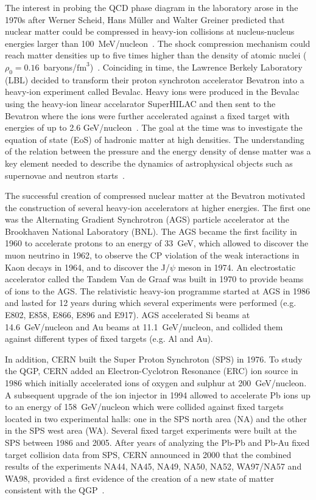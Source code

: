 The interest in probing the QCD phase diagram in the laboratory arose in the 1970s after Werner Scheid, Hans M{\"u}ller and Walter Greiner predicted that nuclear matter could be compressed in heavy-ion collisions at nucleus-nucleus energies larger than 100~MeV/nucleon~\cite{MatterShock}. The shock compression mechanism could reach matter densities up to five times higher than the density of atomic nuclei ($\rho_{0}=0.16$~baryons/$\mathrm{fm}^{3}$)~\cite{MatterShock}. Coinciding in time, the Lawrence Berkely Laboratory (LBL) decided to transform their proton synchroton accelerator Bevatron into a heavy-ion experiment called Bevalac. Heavy ions were produced in the Bevalac using the heavy-ion linear accelarator SuperHILAC and then sent to the Bevatron where the ions were further accelerated against a fixed target with energies of up to 2.6 GeV/nucleon~\cite{Bevalac}. The goal at the time was to investigate the equation of state (EoS) of hadronic matter at high densities. The understanding of the relation between the pressure and the energy density of dense matter was a key element needed to describe the dynamics of astrophysical objects such as supernovae and neutron starts~\cite{NeutronStar, DenseMatter}.

The successful creation of compressed nuclear matter at the Bevatron motivated the construction of several heavy-ion accelerators at higher energies. The first one was the Alternating Gradient Synchrotron (AGS) particle accelerator at the Brookhaven National Laboratory (BNL). The AGS became the first facility in 1960 to accelerate protons to an energy of 33~GeV, which allowed to discover the muon neutrino in 1962, to observe the CP violation of the weak interactions in Kaon decays in 1964, and to discover the J/$\psi$ meson in 1974. An electrostatic accelerator called the Tandem Van de Graaf was built in 1970 to provide beams of ions to the AGS. The relativistic heavy-ion programme started at AGS in 1986 and lasted for 12 years during which several experiments were performed (e.g. E802, E858, E866, E896 and E917). AGS accelerated Si beams at 14.6~GeV/nucleon and Au beams at 11.1~GeV/nucleon, and collided them against different types of fixed targets (e.g. Al and Au).

In addition, CERN built the Super Proton Synchroton (SPS) in 1976. To study the QGP, CERN added an Electron-Cyclotron Resonance (ERC) ion source in 1986 which initially accelerated ions of oxygen and sulphur at 200~GeV/nucleon. A subsequent upgrade of the ion injector in 1994 allowed to accelerate Pb ions up to an energy of 158~GeV/nucleon which were collided against fixed targets located in two experimental halls: one in the SPS north area (NA) and the other in the SPS west area (WA). Several fixed target experiments were built at the SPS between 1986 and 2005. After years of analyzing the Pb-Pb and Pb-Au fixed target collision data from SPS, CERN announced in 2000 that the combined results of the experiments NA44, NA45, NA49, NA50, NA52, WA97/NA57 and WA98, provided a first evidence of the creation of a new state of matter consistent with the QGP~\cite{SPSQGP}.

